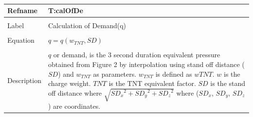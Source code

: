 \documentclass[12pt]{article}
\begin{document}
~\newline
\noindent \begin{minipage}{\textwidth}
\begin{tabular}{p{} p{}}
\toprule \textbf{Refname} & \textbf{T:calOfDe}
\label{T:calOfDe}
\\ \midrule \\
Label & Calculation of Demand(q)
\\ \midrule \\
Equation & $q=q\left({w_{TNT}},SD\right)$
\\ \midrule \\
Description & $q$ or demand, is the 3 second duration equivalent pressure obtained from Figure 2 by interpolation using stand off distance ($SD$) and ${w_{TNT}}$ as parameters. ${w_{TNT}}$ is defined as $w TNT$. $w$ is the charge weight. $TNT$ is the TNT equivalent factor. $SD$ is the stand off distance where $\sqrt{{SD_{x}}^{2}+{SD_{y}}^{2}+{SD_{z}}^{2}}$ where (${SD_{x}}$, ${SD_{y}}$, ${SD_{z}}$) are coordinates.
\\ \bottomrule \end{tabular}
\end{minipage}\\
\end{document}
